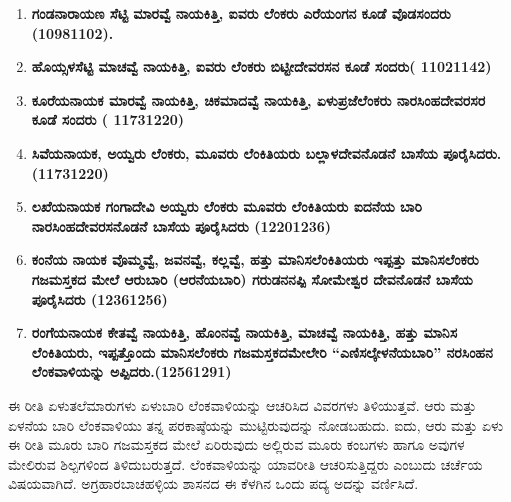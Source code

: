 \begin{enumerate}
\item \textbf{ಗಂಡನಾರಾಯಣ ಸೆಟ್ಟಿ  ಮಾರವ್ವೆ ನಾಯಕಿತ್ತಿ, ಐವರು ಲೆಂಕರು ಎರೆಯಂಗನ ಕೂಡೆ ವೊಡಸಂದರು (10981102).}

 \item \textbf{ಹೊಯ್ಸಳಸೆಟ್ಟಿ  ಮಾಚವ್ವೆ ನಾಯಕಿತ್ತಿ, ಐವರು ಲೆಂಕರು ಬಿಟ್ಟೀದೇವರಸನ ಕೂಡೆ ಸಂದರು( 11021142)}

 \item \textbf{ಕೂರೆಯನಾಯಕ  ಮಾರವ್ವೆ ನಾಯಕಿತ್ತಿ, ಚಿಕಮಾದವ್ವೆ ನಾಯಕಿತ್ತಿ, ಏಳುಪ್ರಜೆಲೆಂಕರು ನಾರಸಿಂಹದೇವರಸರ ಕೂಡೆ ಸಂದರು ( 11731220)}

 \item \textbf{ಸಿವೆಯನಾಯಕ, ಅಯ್ವರು ಲೆಂಕರು, ಮೂವರು ಲೆಂಕಿತಿಯರು ಬಲ್ಲಾಳದೇವನೊಡನೆ ಬಾಸೆಯ ಪೂರೈಸಿದರು. (11731220)}

 \item \textbf{ಲಖೆಯನಾಯಕ  ಗಂಗಾದೇವಿ ಅಯ್ವರು ಲೆಂಕರು ಮೂವರು ಲೆಂಕಿತಿಯರು ಐದನೆಯ ಬಾರಿ ನಾರಸಿಂಹದೇವರಸ\-ನೊಡನೆ ಬಾಸೆಯ ಪೂರೈಸಿದರು (12201236)}

 \item \textbf{ಕಂನೆಯ ನಾಯಕ  ವೊಮ್ಮವ್ವೆ, ಜವನವ್ವೆ, ಕಲ್ಲವ್ವೆ, ಹತ್ತು ಮಾನಿಸಲೆಂಕಿತಿಯರು ಇಪ್ಪತ್ತು ಮಾನಿಸಲೆಂಕರು ಗಜಮಸ್ತಕದ ಮೇಲೆ ಆರುಬಾರಿ (ಆರನೆಯಬಾರಿ) ಗರುಡನನಪ್ಪಿ ಸೋಮೇಶ್ವರ ದೇವನೊಡನೆ ಬಾಸೆಯ ಪೂರೈಸಿದರು (12361256)}

 \item \textbf{ರಂಗೆಯನಾಯಕ  ಕೇತವ್ವೆ ನಾಯಕಿತ್ತಿ, ಹೊಂನವ್ವೆ ನಾಯಕಿತ್ತಿ, ಮಾಚವ್ವೆ ನಾಯಕಿತ್ತಿ, ಹತ್ತು ಮಾನಿಸ ಲೆಂಕಿತಿಯರು, ಇಪ್ಪತ್ತೊಂದು ಮಾನಿಸಲೆಂಕರು ಗಜಮಸ್ತಕದಮೇಲೇರಿ “ಎಣಿಸಲ್ಕೇಳನೆಯಬಾರಿ” ನರಸಿಂಹನ ಲೆಂಕವಾಳಿಯನ್ನು\general{\break } ಅಪ್ಪಿದರು.(12561291)}

\end{enumerate}

ಈ ರೀತಿ ಏಳುತಲೆಮಾರುಗಳು ಏಳುಬಾರಿ ಲೆಂಕವಾಳಿಯನ್ನು ಆಚರಿಸಿದ ವಿವರಗಳು ತಿಳಿಯುತ್ತವೆ. ಆರು ಮತ್ತು ಏಳನೆಯ ಬಾರಿ ಲೆಂಕವಾಳಿಯು ತನ್ನ ಪರಕಾಷ್ಠೆಯನ್ನು ಮುಟ್ಟಿರುವುದನ್ನು ನೋಡಬಹುದು. ಐದು, ಆರು ಮತ್ತು ಏಳು ಈ ರೀತಿ ಮೂರು ಬಾರಿ ಗಜಮಸ್ತಕದ ಮೇಲೆ ಏರಿರುವುದು ಅಲ್ಲಿರುವ ಮೂರು ಕಂಬಗಳು ಹಾಗೂ ಅವುಗಳ ಮೇಲಿರುವ ಶಿಲ್ಪಗಳಿಂದ ತಿಳಿದುಬರುತ್ತದೆ. ಲೆಂಕವಾಳಿಯನ್ನು ಯಾವರೀತಿ ಆಚರಿಸುತ್ತಿದ್ದರು ಎಂಬುದು ಚರ್ಚೆಯ ವಿಷಯವಾಗಿದೆ. ಅಗ್ರಹಾರಬಾಚಹಳ್ಳಿಯ ಶಾಸನದ ಈ ಕೆಳಗಿನ ಒಂದು ಪದ್ಯ ಅದನ್ನು ವರ್ಣಿಸಿದೆ.


